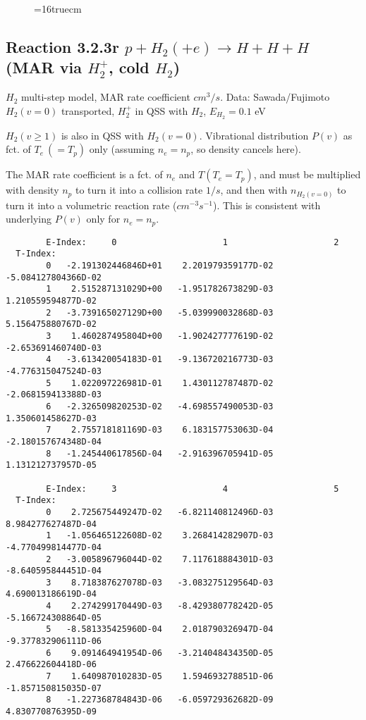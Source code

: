 \documentclass[12pt,dvipdfmx]{article}
\begin{document}
{\begin{small}
\begin{verbatim}
\end{verbatim}\end{small}
\begin{figure} \label{2.3.18B1}
\epsfxsize=16truecm
\end{figure}
\newpage

\subsection{
Reaction 3.2.3r   $p + H_2 (+e)   \rightarrow H + H + H  $ (MAR via $H_2^+$, cold $H_2$)
}

$H_2$ multi-step model, MAR rate coefficient $cm^3/s$.
Data: Sawada/Fujimoto \cite{kn:Sawada}
$H_2(v=0)$ transported, $H_2^+$ in QSS with $H_2$, $E_{H_2}=0.1$ eV

$H_2(v\geq 1)$ is also in QSS with $H_2(v=0)$. Vibrational distribution $P(v)$ as fct. of $T_e~(=T_p)$ only (assuming $n_e=n_p$, so density cancels here).

The MAR rate coefficient is a fct. of $n_e$ and $T (T_e=T_p)$, and must be multiplied with density $n_p$ to turn it into a collision rate $1/s$,
and then with $n_{H_2(v=0)}$ to turn it into a volumetric reaction rate ($cm^{-3}s^{-1}$). This is consistent with underlying $P(v)$ only
for $n_e=n_p$.


\begin{small}\begin{verbatim}
        E-Index:     0                     1                     2
  T-Index:
        0   -2.191302446846D+01    2.201979359177D-02   -5.084127804366D-02
        1    2.515287131029D+00   -1.951782673829D-03    1.210559594877D-02
        2   -3.739165027129D+00   -5.039990032868D-03    5.156475880767D-02
        3    1.460287495804D+00   -1.902427777619D-02   -2.653691460740D-03
        4   -3.613420054183D-01   -9.136720216773D-03   -4.776315047524D-03
        5    1.022097226981D-01    1.430112787487D-02   -2.068159413388D-03
        6   -2.326509820253D-02   -4.698557490053D-03    1.350601458627D-03
        7    2.755718181169D-03    6.183157753063D-04   -2.180157674348D-04
        8   -1.245440617856D-04   -2.916396705941D-05    1.131212737957D-05

        E-Index:     3                     4                     5
  T-Index:
        0    2.725675449247D-02   -6.821140812496D-03    8.984277627487D-04
        1   -1.056465122608D-02    3.268414282907D-03   -4.770499814477D-04
        2   -3.005896796044D-02    7.117618884301D-03   -8.640595844451D-04
        3    8.718387627078D-03   -3.083275129564D-03    4.690013186619D-04
        4    2.274299170449D-03   -8.429380778242D-05   -5.166724308864D-05
        5   -8.581335425960D-04    2.018790326947D-04   -9.377832906111D-06
        6    9.091464941954D-06   -3.214048434350D-05    2.476622604418D-06
        7    1.640987010283D-05    1.594693278851D-06   -1.857150815035D-07
        8   -1.227368784843D-06   -6.059729362682D-09    4.830770876395D-09


\end{verbatim}
\end{small}}
\end{document}
